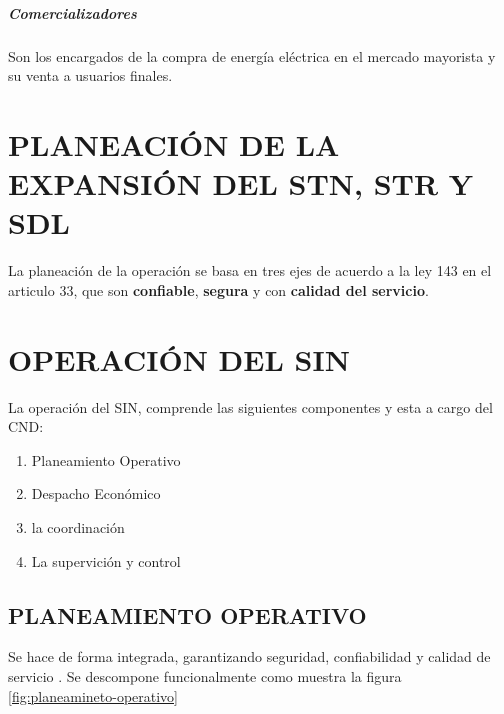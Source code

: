 \documentclass[a5paper]{book}%
\begin{document}
\paragraph{Comercializadores}

Son los encargados de la compra de energía eléctrica en el mercado mayorista y su venta a usuarios finales.

  
\chapter{PLANEACIÓN DE LA EXPANSIÓN DEL STN, STR Y SDL }

La planeación de la operación se basa en tres ejes de acuerdo a la ley 143 \cite{LEY143} en el articulo 33, que son \textbf{confiable}, \textbf{segura} y con \textbf{calidad del servicio}.\\

\chapter{OPERACIÓN DEL SIN}

La operación del \ac{SIN}, comprende las siguientes componentes y esta a cargo del \ac{CND}:

\begin{enumerate}
\item Planeamiento Operativo
\item Despacho Económico
\item la coordinación
\item La supervición y control
\end{enumerate}

\section{PLANEAMIENTO OPERATIVO}

Se hace de forma integrada, garantizando seguridad, confiabilidad y
calidad de servicio \cite{CREG0251995}. Se descompone funcionalmente
como muestra la figura \ref{fig:planeamineto-operativo}\\\\
\end{document}
